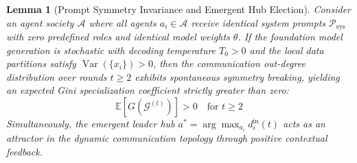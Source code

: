 \documentclass{ieeeaccess}
\newtheorem{lemma}{Lemma}
\begin{document}
\begin{lemma}[Prompt Symmetry Invariance and Emergent Hub Election]
\label{lem:symmetry_breaking}
Consider an agent society $\mathcal{A}$ where all agents $a_i \in \mathcal{A}$ receive identical system prompts $\mathcal{P}_{\text{sys}}$ with zero predefined roles and identical model weights $\theta$. If the foundation model generation is stochastic with decoding temperature $T_0 > 0$ and the local data partitions satisfy $\operatorname{Var}(\{x_i\}) > 0$, then the communication out-degree distribution over rounds $t \ge 2$ exhibits spontaneous symmetry breaking, yielding an expected Gini specialization coefficient strictly greater than zero:
\begin{equation}
\label{eq:lemma2_statement}
\mathbb{E}[G(\mathcal{G}^{(t)})] > 0 \quad \text{for } t \ge 2
\end{equation}
Simultaneously, the emergent leader hub $a^* = \arg\max_{a_i} d_i^{\text{in}}(t)$ acts as an attractor in the dynamic communication topology through positive contextual feedback.
\end{lemma}
\end{document}
